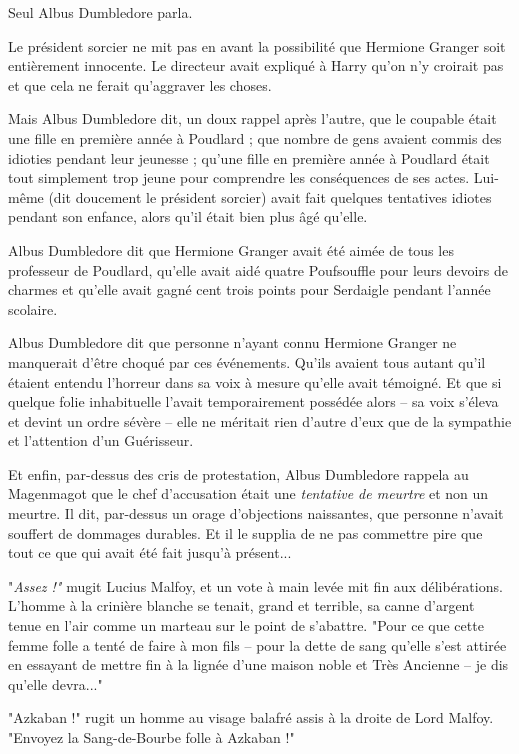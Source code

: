 Seul Albus Dumbledore parla.

Le président sorcier ne mit pas en avant la possibilité que Hermione Granger soit entièrement innocente. Le directeur avait expliqué à Harry qu'on n'y croirait pas et que cela ne ferait qu'aggraver les choses.

Mais Albus Dumbledore dit, un doux rappel après l'autre, que le coupable était une fille en première année à Poudlard ; que nombre de gens avaient commis des idioties pendant leur jeunesse ; qu'une fille en première année à Poudlard était tout simplement trop jeune pour comprendre les conséquences de ses actes. Lui-même (dit doucement le président sorcier) avait fait quelques tentatives idiotes pendant son enfance, alors qu'il était bien plus âgé qu'elle.

Albus Dumbledore dit que Hermione Granger avait été aimée de tous les professeur de Poudlard, qu'elle avait aidé quatre Poufsouffle pour leurs devoirs de charmes et qu'elle avait gagné cent trois points pour Serdaigle pendant l'année scolaire.

Albus Dumbledore dit que personne n'ayant connu Hermione Granger ne manquerait d'être choqué par ces événements. Qu'ils avaient tous autant qu'il étaient entendu l'horreur dans sa voix à mesure qu'elle avait témoigné. Et que si quelque folie inhabituelle l'avait temporairement possédée alors – sa voix s'éleva et devint un ordre sévère – elle ne méritait rien d'autre d'eux que de la sympathie et l'attention d'un Guérisseur.

Et enfin, par-dessus des cris de protestation, Albus Dumbledore rappela au Magenmagot que le chef d'accusation était une \emph{tentative de meurtre } et non un meurtre. Il dit, par-dessus un orage d'objections naissantes, que personne n'avait souffert de dommages durables. Et il le supplia de ne pas commettre pire que tout ce que qui avait été fait jusqu'à présent...

"\emph{Assez !"}  mugit Lucius Malfoy, et un vote à main levée mit fin aux délibérations. L'homme à la crinière blanche se tenait, grand et terrible, sa canne d'argent tenue en l'air comme un marteau sur le point de s'abattre. "Pour ce que cette femme folle a tenté de faire à mon fils – pour la dette de sang qu'elle s'est attirée en essayant de mettre fin à la lignée d'une maison noble et Très Ancienne – je dis qu'elle devra..."

"Azkaban !" rugit un homme au visage balafré assis à la droite de Lord Malfoy. "Envoyez la Sang-de-Bourbe folle à Azkaban !"

